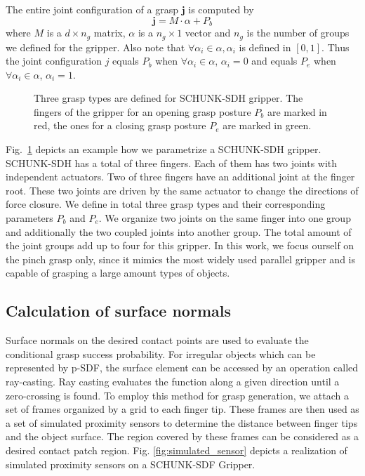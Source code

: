 The entire joint configuration of a grasp $\bm{j}$ is computed by 
\begin{equation}
\bm{j} = M \cdot \alpha + P_b
\label{equ:eigen_grasp}
\end{equation}
where $M$ is a $d \times n_g$ matrix, $\alpha$ is a $n_g \times 1$ vector and $n_g$ is the number of groups we defined for the gripper. Also note that $\forall \alpha_i \in \alpha, \alpha_i$ is defined in $[0,1]$. Thus the joint configuration $j$ equals $P_b$ when $\forall \alpha_i \in \alpha$, $\alpha_i = 0$ and equals $P_e$ when $\forall \alpha_i \in \alpha$, $\alpha_i = 1$. 

\begin{figure}[!htbp]
\centering
\def\svgwidth{1\linewidth}

\caption{Three grasp types are defined for SCHUNK-SDH gripper. The fingers of the gripper for an opening grasp posture $P_b$ are marked in red, the ones for a closing grasp posture $P_e$ are marked in green.}
\label{fig:grasp_types}
\end{figure}	

Fig.~\ref{fig:grasp_types} depicts an example how we parametrize a SCHUNK-SDH gripper. SCHUNK-SDH has a total of three fingers. Each of them has two joints with independent actuators. Two of three fingers have an additional joint at the finger root. These two joints are driven by the same actuator to change the directions of force closure. We define in total three grasp types and their corresponding parameters $P_b$ and $P_e$. We organize two joints on the same finger into one group and additionally the two coupled joints into another group. The total amount of the joint groups add up to four for this gripper. In this work, we focus ourself on the pinch grasp only, since it mimics the most widely used parallel gripper and is capable of grasping a large amount types of objects.  



\subsection{Calculation of surface normals}
Surface normals on the desired contact points are used to evaluate the conditional grasp success probability. For irregular objects which can be represented by p-SDF, the surface element can be accessed by an operation called ray-casting. Ray casting evaluates the function along a given direction until a zero-crossing is found. To employ this method for grasp generation, we attach a set of frames organized by a grid to each finger tip. These frames are then used as a set of simulated proximity sensors to determine the distance between finger tips and the object surface. The region covered by these frames can be considered as a desired contact patch region. Fig. \ref{fig:simulated_sensor} depicts a realization of simulated proximity sensors on a SCHUNK-SDF Gripper.

